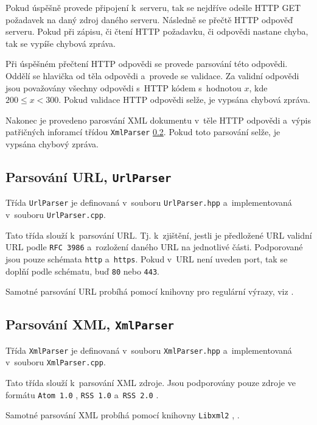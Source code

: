 \documentclass[a4paper, 11pt]{article}
\begin{document}
	Pokud úspěšně provede připojení k~serveru, tak se nejdříve odešle HTTP
	GET požadavek na daný zdroj daného serveru. Následně se přečtě HTTP
	odpověď serveru. Pokud při zápisu, či čtení HTTP požadavku, či odpovědi
	nastane chyba, tak se vypíše chybová zpráva.

	Při úspěšném přečtení HTTP odpovědi se provede parsování této odpovědi.
	Oddělí se hlavička od těla odpovědi a~provede se validace. Za validní
	odpovědi jsou považovány všechny odpovědi s~HTTP kódem s~hodnotou $ x $,
	kde $ 200 \leq x < 300 $. Pokud validace HTTP odpovědi selže, je vypsána
	chybová zpráva.

	Nakonec je provedeno parosvání XML dokumentu v~těle HTTP odpovědi
	a~výpis patřičných inforamcí třídou \texttt{XmlParser}
	\ref{section:xml_parser}. Pokud toto parsování selže, je vypsána chybový
	zpráva.


	\subsection{Parsování URL, \texttt{UrlParser}}
	\label{section:url_parser}

	Třída \texttt{UrlParser} je definovaná v~souboru
	\texttt{UrlParser.hpp} a~implementovaná v~souboru
	\texttt{UrlParser.cpp}.

	Tato třída slouží k~parsování URL. Tj. k~zjištění, jestli je předložené
	URL validní URL podle \texttt{RFC 3986} \cite{url} a~rozložení daného
	URL na jednotlivé části. Podporované jsou pouze schémata \texttt{http}
	a~\texttt{https}. Pokud v~URL není uveden port, tak se doplňí podle
	schématu, buď \texttt{80} nebo \texttt{443}.

	Samotné parsování URL probíhá pomocí knihovny pro regulární výrazy, viz
	\cite{regex}.


	\subsection{Parsování XML, \texttt{XmlParser}}
	\label{section:xml_parser}

	Třída \texttt{XmlParser} je definovaná v~souboru
	\texttt{XmlParser.hpp} a~implementovaná v~souboru
	\texttt{XmlParser.cpp}.

	Tato třída slouží k~parsování XML zdroje. Jsou podporovány pouze zdroje
	ve formátu \texttt{Atom 1.0} \cite{atom}, \texttt{RSS 1.0} \cite{rss1}
	a~\texttt{RSS 2.0} \cite{rss2}.

	Samotné parsování XML probíhá pomocí knihovny \texttt{Libxml2}
	\cite{libxml}, \cite{libxml_tutorial}.
\end{document}
